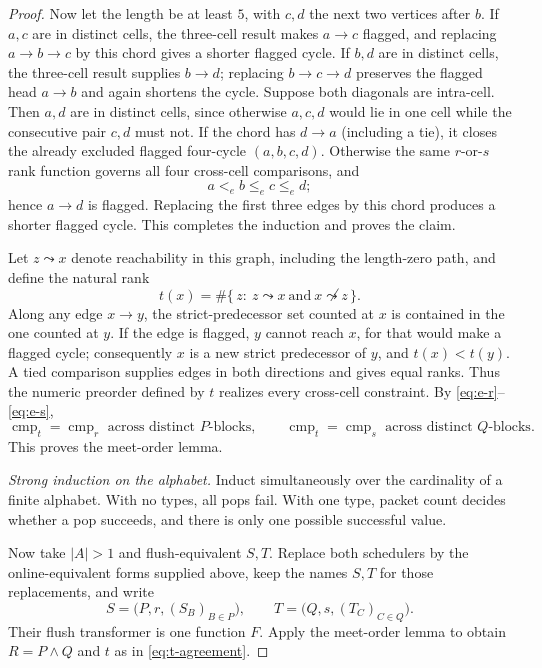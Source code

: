 \documentclass[11pt]{article}
\theoremstyle{definition}
\newcommand{\cmp}{\operatorname{cmp}}
\begin{document}
\begin{proof}
Now let the length be at least \(5\), with \(c,d\) the next two vertices
after \(b\).  If \(a,c\) are in distinct cells, the three-cell result makes
\(a\to c\) flagged, and replacing \(a\to b\to c\) by this chord gives a
shorter flagged cycle.  If \(b,d\) are in distinct cells, the three-cell
result supplies \(b\to d\); replacing \(b\to c\to d\) preserves the flagged
head \(a\to b\) and again shortens the cycle.  Suppose both diagonals are
intra-cell.  Then \(a,d\) are in distinct cells, since otherwise \(a,c,d\)
would lie in one cell while the consecutive pair \(c,d\) must not.  If the
chord has \(d\to a\) (including a tie), it closes the already excluded
flagged four-cycle \((a,b,c,d)\).  Otherwise the same \(r\)-or-\(s\) rank
function governs all four cross-cell comparisons, and
\[
  a<_e b\le_e c\le_e d;
\]
hence \(a\to d\) is flagged.  Replacing the first three edges by this chord
produces a shorter flagged cycle.  This completes the induction and proves
the claim.

Let \(z\leadsto x\) denote reachability in this graph, including the
length-zero path, and define the natural rank
\begin{equation}
  t(x)
  =
  \#\{\,z:\ z\leadsto x\ \text{and}\ x\not\leadsto z\,\}.
  \tag{12}\label{eq:linearization}
\end{equation}
Along any edge \(x\to y\), the strict-predecessor set counted at \(x\) is
contained in the one counted at \(y\).  If the edge is flagged, \(y\) cannot
reach \(x\), for that would make a flagged cycle; consequently \(x\) is a new
strict predecessor of \(y\), and \(t(x)<t(y)\).  A tied comparison supplies
edges in both directions and gives equal ranks.  Thus the numeric preorder
defined by \(t\) realizes every cross-cell constraint.  By
\eqref{eq:e-r}--\eqref{eq:e-s},
\begin{equation}
  \cmp_t=\cmp_r\text{ across distinct }P\text{-blocks},
  \qquad
  \cmp_t=\cmp_s\text{ across distinct }Q\text{-blocks}.
  \tag{13}\label{eq:t-agreement}
\end{equation}
This proves the meet-order lemma.

\medskip
\noindent\textit{Strong induction on the alphabet.}
Induct simultaneously over the cardinality of a finite alphabet.  With no
types, all pops fail.  With one type, packet count decides whether a pop
succeeds, and there is only one possible successful value.

Now take \(|A|>1\) and flush-equivalent \(S,T\).  Replace both schedulers by
the online-equivalent forms supplied above, keep the names \(S,T\) for those
replacements, and write
\[
  S=\bigl(P,r,(S_B)_{B\in P}\bigr),
  \qquad
  T=\bigl(Q,s,(T_C)_{C\in Q}\bigr).
\]
Their flush transformer is one function \(F\).  Apply the meet-order lemma
to obtain \(R=P\wedge Q\) and \(t\) as in \eqref{eq:t-agreement}.


\end{proof}
\end{document}
